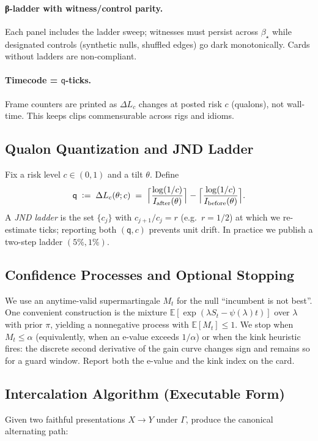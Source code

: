 \documentclass[11pt]{article}
\newcommand{\E}{\mathbb{E}}
\newcommand{\1}{\mathbf{1}}
\newcommand{\defeq}{\vcentcolon=}
\newcommand{\Guard}{\Gamma}
\newcommand{\rate}{I}
\newcommand{\Blur}{\beta}
\newcommand{\Lc}{L_c}
\newcommand{\Qualon}{\mathsf{q}}        %
\begin{document}
\paragraph{β-ladder with witness/control parity.}
Each panel includes the ladder sweep; witnesses must persist across $\Blur_\star$ while designated controls (synthetic nulls, shuffled edges) go dark monotonically. Cards without ladders are non-compliant.

\paragraph{Timecode = \(\Qualon\)-ticks.}
Frame counters are printed as $\Delta\Lc$ changes at posted risk $c$ (qualons), not wall-time. This keeps clips commensurable across rigs and idioms.

\subsection{Qualon Quantization and JND Ladder}
Fix a risk level $c\in(0,1)$ and a tilt $\theta$. Define
\[
\Qualon \;\defeq\; \Delta \Lc(\theta;c)\;=\; \Big\lceil \frac{\log(1/c)}{\rate_{\text{after}}(\theta)} \Big\rceil
-\Big\lceil \frac{\log(1/c)}{\rate_{\text{before}}(\theta)} \Big\rceil.
\]
A \emph{JND ladder} is the set $\{c_j\}$ with $c_{j+1}/c_j = r$ (e.g.\ $r=1/2$) at which we re-estimate ticks; reporting both $(\Qualon, c)$ prevents unit drift. In practice we publish a two-step ladder $(5\%,1\%)$.

\subsection{Confidence Processes and Optional Stopping}
We use an anytime-valid supermartingale $M_t$ for the null “incumbent is not best”. One convenient construction is the mixture $\mathbb{E}[\exp(\lambda S_t-\psi(\lambda)t)]$ over $\lambda$ with prior $\pi$, yielding a nonnegative process with $\E[M_t]\le 1$. We stop when $M_t\le \alpha$ (equivalently, when an e-value exceeds $1/\alpha$) or when the kink heuristic fires: the discrete second derivative of the gain curve changes sign and remains so for a guard window. Report both the e-value and the kink index on the card.

\subsection{Intercalation Algorithm (Executable Form)}
Given two faithful presentations $X\!\to Y$ under $\Guard$, produce the canonical alternating path:
\end{document}
